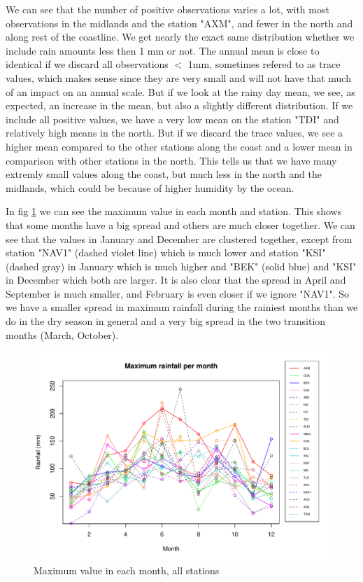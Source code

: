 \documentclass{article}
\begin{document}
	We can see that the number of positive observations varies a lot, with most observations in the midlands and the station "AXM", and fewer in the north and along rest of the coastline. We get nearly the exact same distribution whether we include rain amounts less then 1 mm or not. The annual mean is close to identical if we discard all observations $<$ 1mm, sometimes refered to as trace values, which makes sense since they are very small and will not have that much of an impact on an annual scale. But if we look at the rainy day mean, we see, as expected, an increase in the mean, but also a slightly different distribution. If we include all positive values, we have a very low mean on the station "TDI" and relatively high means in the north. But if we discard the trace values, we see a higher mean compared to the other stations along the coast and a lower mean in comparison with other stations in the north. This tells us that we have many extremly small values along the coast, but much less in the north and the midlands, which could be because of higher humidity by the ocean.
	
	In fig \ref{MaxAll} we can see the maximum value in each month and station. This shows that some months have a big spread and others are much closer together. We can see that the values in January and December are clustered together, except from station "NAV1" (dashed violet line) which is much lower and station "KSI" (dashed gray) in January which is much higher and "BEK" (solid blue) and "KSI" in December which both are larger. It is also clear that the spread in April and September is much smaller, and February is even closer if we ignore "NAV1". So we have a smaller spread in maximum rainfall during the rainiest months than we do in the dry season in general and a very big spread in the two transition months (March, October).
	
	\begin{figure}[H]
		\centering
		\includegraphics[width=1\linewidth]{MonMax.pdf}
		\caption{Maximum value in each month, all stations}
		\label{MaxAll}
	\end{figure}
	
\end{document}
